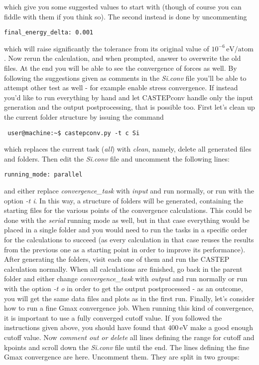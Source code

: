 \documentclass[10pt]{article}
\begin{document}
which give you some suggested values to start with (though of course you can fiddle with them if you think so). The second instead is done by uncommenting

\begin{lstlisting}
final_energy_delta:	0.001
\end{lstlisting}

which will raise significantly the tolerance from its original value of $10^{-6}\,\mathrm{eV/atom}$.\newline
Now rerun the calculation, and when prompted, answer to overwrite the old files. At the end you will be able to see the convergence of forces as well. By following the suggestions given as comments in the \textit{Si.conv} file you'll be able to attempt other test as well - for example enable stress convergence.\newline
If instead you'd like to run everything by hand and let CASTEPconv handle only the input generation and the output postprocessing, that is possible too. First let's clean up the current folder structure by issuing the command

\begin{lstlisting}
 user@machine:~$ castepconv.py -t c Si
\end{lstlisting}

which replaces the current task (\textit{all}) with \textit{clean}, namely, delete all generated files and folders. Then edit the \textit{Si.conv} file and uncomment the following lines:

\begin{lstlisting}
running_mode: parallel
\end{lstlisting}

and either replace \textit{convergence\_task} with \textit{input} and run normally, or run with the option \textit{-t i}. In this way, a structure of folders will be generated, containing the starting files for the various points of the convergence calculations. This could be done with the \textit{serial} running mode as well, but in that case everything would be placed in a single folder and you would need to run the tasks in a specific order for the calculations to succeed (as every calculation in that case reuses the results from the previous one as a starting point in order to improve its performance). After generating the folders, visit each one of them and run the CASTEP calculation normally. When all calculations are finished, go back in the parent folder and either change \textit{convergence\_task} with \textit{output} and run normally or run with the option \textit{-t o} in order to get the output postprocessed - as an outcome, you will get the same data files and plots as in the first run.\newline
Finally, let's consider how to run a fine Gmax convergence job. When running this kind of convergence, it is important to use a fully converged cutoff value. If you followed the instructions given above, you should have found that $400\,\mathrm{eV}$ make a good enough cutoff value. Now \textit{comment out or delete} all lines defining the range for cutoff and kpoints and scroll down the \textit{Si.conv} file until the end. The lines defining the fine Gmax convergence are here. Uncomment them. They are split in two groups:
\end{document}
